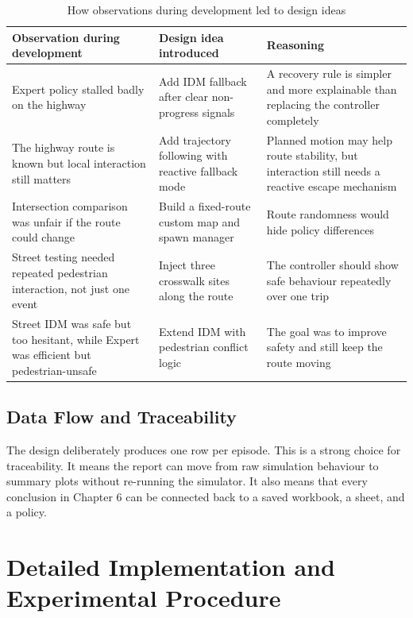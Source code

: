 \documentclass[12pt,a4paper]{report}
\begin{document}
\begin{table}[H]
    \centering
    \small
    \caption{How observations during development led to design ideas}
    \label{tab:idea_evolution}
    \begin{tabularx}{\textwidth}{>{\raggedright\arraybackslash}p{3.1cm} X X}
        \toprule
        Observation during development & Design idea introduced & Reasoning \\
        \midrule
        Expert policy stalled badly on the highway & Add IDM fallback after clear non-progress signals & A recovery rule is simpler and more explainable than replacing the controller completely \\
        The highway route is known but local interaction still matters & Add trajectory following with reactive fallback mode & Planned motion may help route stability, but interaction still needs a reactive escape mechanism \\
        Intersection comparison was unfair if the route could change & Build a fixed-route custom map and spawn manager & Route randomness would hide policy differences \\
        Street testing needed repeated pedestrian interaction, not just one event & Inject three crosswalk sites along the route & The controller should show safe behaviour repeatedly over one trip \\
        Street IDM was safe but too hesitant, while Expert was efficient but pedestrian-unsafe & Extend IDM with pedestrian conflict logic & The goal was to improve safety and still keep the route moving \\
        \bottomrule
    \end{tabularx}
\end{table}

\section{Data Flow and Traceability}
The design deliberately produces one row per episode. This is a strong choice for traceability. It means the report can move from raw simulation behaviour to summary plots without re-running the simulator. It also means that every conclusion in Chapter 6 can be connected back to a saved workbook, a sheet, and a policy.

\chapter{Detailed Implementation and Experimental Procedure}
\end{document}
